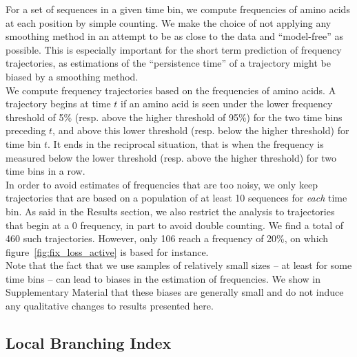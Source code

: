 \documentclass[reprint,amsmath,amssymb,superscriptaddress,showpacs,rmp]{revtex4-1}
\begin{document}
	For a set of sequences in a given time bin, we compute frequencies of amino acids at each position by simple counting. We make the choice of not applying any smoothing method in an attempt to be as close to the data and ``model-free'' as possible. This is especially important for the short term prediction of frequency trajectories, as estimations of the ``persistence time'' of a trajectory might be biased by a smoothing method. \\
	We compute frequency trajectories based on the frequencies of amino acids. A trajectory begins at time $t$ if an amino acid is seen under the lower frequency threshold of 5\% (resp. above the higher threshold of 95\%) for the two time bins preceding $t$, and above this lower threshold (resp. below the higher threshold) for time bin $t$. It ends in the reciprocal situation, that is when the frequency is measured below the lower threshold (resp. above the higher threshold) for two time bins in a row. \\
	In order to avoid estimates of frequencies that are too noisy, we only keep trajectories that are based on a population of at least 10 sequences for \emph{each} time bin. As said in the Results section, we also restrict the analysis to trajectories that begin at a $0$ frequency, in part to avoid double counting. We find a total of 460 such trajectories. However, only 106 reach a frequency of 20\%, on which figure~\ref{fig:fix_loss_active} is based for instance.  \\
	Note that the fact that we use samples of relatively small sizes -- at least for some time bins -- can lead to biases in the estimation of frequencies. We show in Supplementary Material that these biases are generally small and do not induce any qualitative changes to results presented here.


\subsection*{Local Branching Index} %
\label{sub:local_branching_index}
\end{document}
